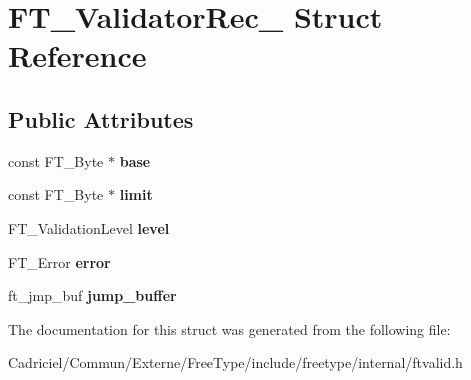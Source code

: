 \hypertarget{struct_f_t___validator_rec__}{}\section{F\+T\+\_\+\+Validator\+Rec\+\_\+ Struct Reference}
\label{struct_f_t___validator_rec__}
\subsection*{Public Attributes}
\begin{DoxyCompactItemize}
\item 
const F\+T\+\_\+\+Byte $\ast$ {\bfseries base}\hypertarget{struct_f_t___validator_rec___a62de459b75acae3e1695b3d6600ca22f}{}\label{struct_f_t___validator_rec___a62de459b75acae3e1695b3d6600ca22f}

\item 
const F\+T\+\_\+\+Byte $\ast$ {\bfseries limit}\hypertarget{struct_f_t___validator_rec___acc4d58a3e46d2b7c92bb51c3ddd8d331}{}\label{struct_f_t___validator_rec___acc4d58a3e46d2b7c92bb51c3ddd8d331}

\item 
F\+T\+\_\+\+Validation\+Level {\bfseries level}\hypertarget{struct_f_t___validator_rec___aa70830280c76507b8b06e616da8cb545}{}\label{struct_f_t___validator_rec___aa70830280c76507b8b06e616da8cb545}

\item 
F\+T\+\_\+\+Error {\bfseries error}\hypertarget{struct_f_t___validator_rec___ab12d54f54a55a90ce19761a1c24e28f0}{}\label{struct_f_t___validator_rec___ab12d54f54a55a90ce19761a1c24e28f0}

\item 
ft\+\_\+jmp\+\_\+buf {\bfseries jump\+\_\+buffer}\hypertarget{struct_f_t___validator_rec___aa0b346f9ef78939e93c85389aa2b54b3}{}\label{struct_f_t___validator_rec___aa0b346f9ef78939e93c85389aa2b54b3}

\end{DoxyCompactItemize}


The documentation for this struct was generated from the following file\+:\begin{DoxyCompactItemize}
\item 
Cadriciel/\+Commun/\+Externe/\+Free\+Type/include/freetype/internal/ftvalid.\+h\end{DoxyCompactItemize}

